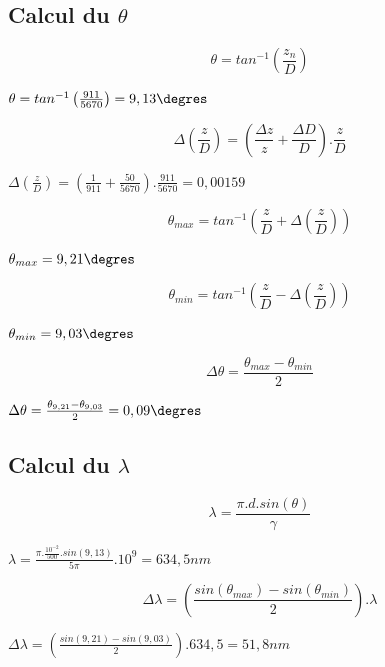 \documentclass[11pt,a4paper]{report}
\begin{document}
	\subsection{Calcul du $\theta$}
	\begin{equation}
	\theta = tan^{-1}\left(\frac{z_{n}}{D}\right) 
	\end{equation}
	\begin{center}
	$\theta = tan^{-1}\left(\frac{911}{5670}\right) = 9,13\degres$
	\end{center}
	\begin{equation}
	\Delta\left(\frac{z}{D}\right)=\left(\frac{\Delta z}{z}+\frac{\Delta D}{D}\right).\frac{z}{D}
	\end{equation}
	\begin{center}
	$\Delta\left(\frac{z}{D}\right)=\left(\frac{1}{911}+\frac{50}{5670}\right).\frac{911}{5670}= 0,00159$
	\end{center}
	\begin{equation}
	\theta_{max} = tan^{-1}\left(\frac{z}{D}+\Delta\left(\frac{z}{D}\right)\right)
	\end{equation}
	\begin{center}
	$\theta_{max} =9,21\degres$
	\end{center}
	\begin{equation}
	\theta_{min} = tan^{-1}\left(\frac{z}{D}-\Delta\left(\frac{z}{D}\right)\right)
	\end{equation}
	\begin{center}
	$\theta_{min} =9,03\degres$
	\end{center}
	\begin{equation}
\Delta\theta=\frac{\theta_{max}-\theta_{min}}{2}
	\end{equation}
	\begin{center}
	$\Delta\theta=\frac{\theta_{9,21}-\theta_{9,03}}{2} = 0,09\degres$
	\end{center}
	\subsection{Calcul du $\lambda$}
	\begin{equation}
	\lambda = \frac{\pi.d.sin(\theta)}{\gamma}
	\end{equation}
	\begin{center}
	$\lambda = \frac{\pi . \frac{10^{-2}}{500}.sin(9,13)}{5\pi} . 10^{9} = 634,5 nm $
	\end{center}
	\begin{equation}
	\Delta \lambda = \left(\frac{sin(\theta_{max})-sin(\theta_{min})}{2}\right) . \lambda
	\end{equation}
	\begin{center}
	$\Delta \lambda = \left(\frac{sin(9,21)-sin(9,03)}{2}\right) . 634,5 = 51,8 nm$
	\end{center}
\end{document}
